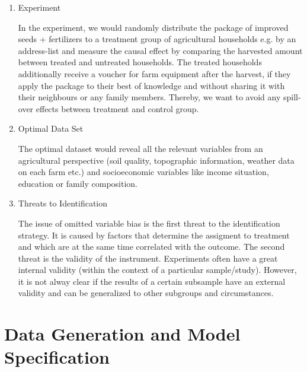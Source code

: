 \begin{enumerate}
\item Experiment

In the experiment, we would randomly distribute the package of improved seeds + fertilizers to a treatment group of agricultural households e.g. by an address-list and measure the causal effect by comparing the harvested amount between treated and untreated households. The treated households additionally receive a voucher for farm equipment after the harvest, if they apply the package to their best of knowledge and without sharing it with their neighbours or any family members. Thereby, we want to avoid any spill-over effects between treatment and control group.

\item Optimal Data Set

The optimal dataset would reveal all the relevant variables from an agricultural perspective (soil quality, topographic information, weather data on each farm etc.) and socioeconomic variables like income situation, education or family composition.

\item Threats to Identification

The issue of omitted variable bias is the first threat to the identification strategy. It is caused by factors that determine the assigment to treatment and which are at the same time correlated with the outcome.
The second threat is the validity of the instrument. Experiments often have a great internal validity (within the context of a particular sample/study). However, it is not alway clear if the results of a certain subsample have an external validity and can be generalized to other subgroups and circumstances. 



\end{enumerate}

\section{Data Generation and Model Specification} \label{sec:data}

